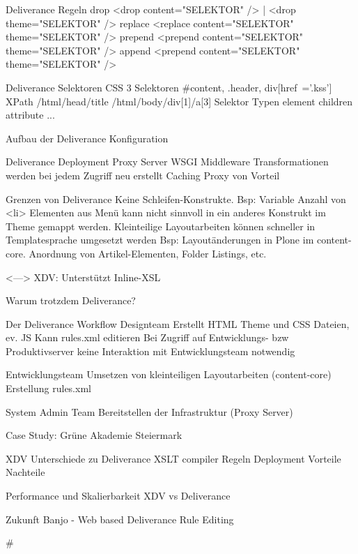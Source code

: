 Deliverance Regeln
    drop
        <drop content="SELEKTOR" /> | <drop theme="SELEKTOR" />
    replace
        <replace content="SELEKTOR" theme="SELEKTOR" />
    prepend
        <prepend content="SELEKTOR" theme="SELEKTOR" />
    append
        <prepend content="SELEKTOR" theme="SELEKTOR" />

Deliverance Selektoren
    CSS 3 Selektoren
        #content, .header, div[href~='.kss']
    XPath
        /html/head/title
        /html/body/div[1]/a[3]
    Selektor Typen
        element
        children
        attribute
        ...


Aufbau der Deliverance Konfiguration


Deliverance Deployment
    Proxy Server
    WSGI Middleware
    Transformationen werden bei jedem Zugriff neu erstellt
    Caching Proxy von Vorteil


Grenzen von Deliverance
    Keine Schleifen-Konstrukte.
        Bsp: Variable Anzahl von <li> Elementen aus Menü kann nicht sinnvoll in ein anderes Konstrukt im Theme gemappt werden.
    Kleinteilige Layoutarbeiten können schneller in Templatesprache umgesetzt werden
        Bsp: Layoutänderungen in Plone im content-core. Anordnung von Artikel-Elementen, Folder Listings, etc.

    <---> XDV: Unterstützt Inline-XSL

Warum trotzdem Deliverance?

Der Deliverance Workflow
    Designteam
        Erstellt HTML Theme und CSS Dateien, ev. JS
        Kann rules.xml editieren
        Bei Zugriff auf Entwicklungs- bzw Produktivserver keine Interaktion mit Entwicklungsteam notwendig

    Entwicklungsteam
        Umsetzen von kleinteiligen Layoutarbeiten (content-core)
        Erstellung rules.xml

    System Admin Team
        Bereitstellen der Infrastruktur (Proxy Server)


Case Study: Grüne Akademie Steiermark


XDV
    Unterschiede zu Deliverance
        XSLT compiler
        Regeln
        Deployment
        Vorteile
        Nachteile

Performance und Skalierbarkeit
    XDV vs Deliverance

Zukunft
    Banjo - Web based Deliverance Rule Editing


#
